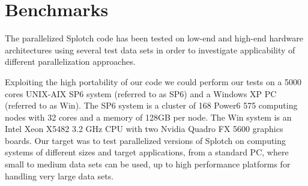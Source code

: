 \documentclass[1p,times]{elsarticle}
\begin{document}


\section{Benchmarks}

The parallelized Splotch code has been tested on low-end and high-end hardware 
architectures using several test data sets in order to investigate applicability of
different parallelization approaches.

Exploiting the high portability of our code we could perform our tests on a 
5000 cores UNIX-AIX  SP6 system (referred to as SP6) and a Windows XP PC (referred to as Win). 
The SP6 system is a cluster of 168 Power6 575 computing nodes with 32 cores
and a memory of 128GB per node. The Win system is an Intel Xeon X5482 3.2 GHz CPU with 
two Nvidia Quadro FX 5600 graphics boards. Our target was to test parallelized
versions of Splotch on computing systems of different sizes and target applications, 
from a standard PC, where small to medium data sets can be used, up to high
performance platforms for handling very large data sets.
\end{document}
